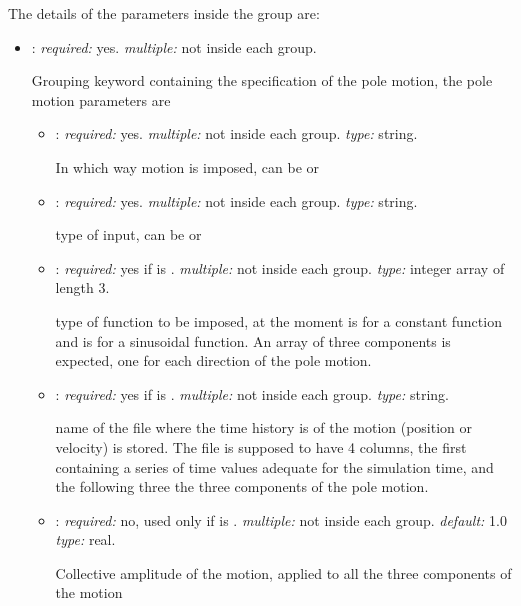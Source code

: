 The details of the parameters inside the  group are:
\begin{itemize}
\item {}: \textit{required:} yes. \textit{multiple:} not inside each  group.

Grouping keyword containing the specification of the pole motion, the pole motion parameters are

	\begin{itemize}
	\item {}: \textit{required:} yes. \textit{multiple:} not inside each  group. \textit{type:} string.
    
    In which way motion is imposed, can be  or 
    
    \item {}: \textit{required:} yes. \textit{multiple:} not inside each  group. \textit{type:} string.
    
    type of input, can be  or 
    
    \item {}: \textit{required:} yes if  is . \textit{multiple:} not inside each  group. \textit{type:} integer array of length 3.
    
    type of function to be imposed, at the moment  is for a constant function and  is for a sinusoidal function. An array of three components is expected, one for each direction of the pole motion.
    
        \item {}: \textit{required:} yes if  is . \textit{multiple:} not inside each  group. \textit{type:} string.
        
        name of the file where the time history is of the motion (position or velocity) is stored. The file is supposed to have 4 columns, the first containing a series of time values adequate for the simulation time, and the following three the three components of the pole motion. 
        
    \item {}: \textit{required:} no, used only if  is . \textit{multiple:} not inside each  group. \textit{default:} 1.0 \textit{type:} real.
    
    Collective amplitude of the motion, applied to all the three components of the motion    
    

\end{itemize}
\end{itemize}
